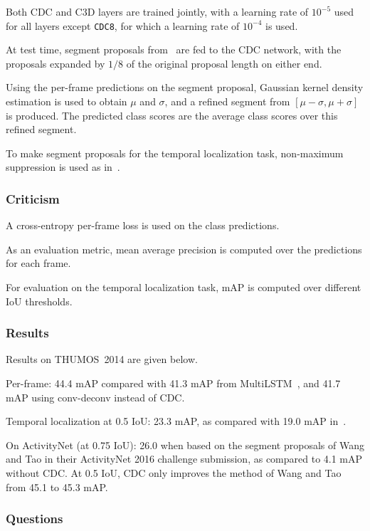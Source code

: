 \documentclass[a4paper, 12pt]{article}
\begin{document}
Both CDC and C3D layers are trained jointly, with a learning rate of
$10^{-5}$ used for all layers except \verb|CDC8|, for which a learning rate
of $10^{-4}$ is used.

At test time, segment proposals from~\citet{DBLP:journals/corr/ShouWC16} are
fed to the CDC network, with the proposals expanded by $1/8$ of the original
proposal length on either end.

Using the per-frame predictions on the segment proposal, Gaussian kernel
density estimation is used to obtain $\mu$ and $\sigma$, and a refined segment
from $[\mu - \sigma, \mu + \sigma]$ is produced. The predicted class scores are
the average class scores over this refined segment.

To make segment proposals for the temporal localization task, non-maximum
suppression is used as
in~\citet{DBLP:journals/corr/YeungRJAML15, DBLP:journals/corr/ShouWC16}.

\subsubsection{Criticism}

A cross-entropy per-frame loss is used on the class predictions.

As an evaluation metric, mean average precision is computed over the
predictions for each frame.

For evaluation on the temporal localization task, mAP is computed over
different IoU thresholds.

\subsubsection{Results}

Results on THUMOS~2014 are given below.

Per-frame: 44.4 mAP compared with 41.3 mAP from
MultiLSTM~\citet{DBLP:journals/corr/YeungRJAML15}, and 41.7 mAP using
conv-deconv instead of CDC\@.

Temporal localization at 0.5 IoU\@: 23.3 mAP, as compared with 19.0 mAP
in~\citet{DBLP:journals/corr/ShouWC16}.

On ActivityNet (at 0.75 IoU): 26.0 when based on the segment proposals
of Wang and Tao in their ActivityNet 2016 challenge submission, as compared to
4.1 mAP without CDC\@. At 0.5 IoU, CDC only improves the method of Wang and Tao
from 45.1 to 45.3 mAP\@.

\subsubsection{Questions}
\end{document}

